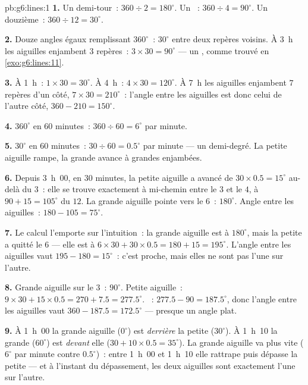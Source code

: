 \begin{solution}{pb:g6:lines:1}
\textbf{1.} Un demi-tour~: $360 \div 2 = 180^\circ$. Un ~:
$360 \div 4 = 90^\circ$. Un douzième~: $360 \div 12 = 30^\circ$.

\textbf{2.} Douze angles égaux remplissant $360^\circ$~: $30^\circ$
entre deux repères voisins. À 3~h les aiguilles enjambent $3$
repères~: $3 \times 30 = 90^\circ$ --- un , comme trouvé
en \cref{exo:g6:lines:11}.

\textbf{3.} À 1~h~: $1 \times 30 = 30^\circ$. À 4~h~:
$4 \times 30 = 120^\circ$. À 7~h les aiguilles enjambent $7$ repères
d'un côté, $7 \times 30 = 210^\circ$~: l'angle entre les aiguilles
est donc celui de l'autre côté, $360 - 210 = 150^\circ$.

\textbf{4.} $360^\circ$ en $60$ minutes~: $360 \div 60 = 6^\circ$
par minute.

\textbf{5.} $30^\circ$ en $60$ minutes~: $30 \div 60 = 0.5^\circ$
par minute --- un demi-degré. La petite aiguille rampe, la grande
avance à grandes enjambées.

\textbf{6.} Depuis 3~h~00, en $30$ minutes, la petite aiguille a
avancé de $30 \times 0.5 = 15^\circ$ au-delà du $3$~: elle se trouve
exactement à mi-chemin entre le $3$ et le $4$, à
$90 + 15 = 105^\circ$ du $12$. La grande aiguille pointe vers le
$6$~: $180^\circ$. Angle entre les aiguilles~:
$180 - 105 = 75^\circ$.

\textbf{7.} Le calcul l'emporte sur l'intuition~: la grande aiguille
est à $180^\circ$, mais la petite a quitté le $6$ --- elle est à
$6 \times 30 + 30 \times 0.5 = 180 + 15 = 195^\circ$. L'angle entre
les aiguilles vaut $195 - 180 = 15^\circ$~: c'est proche, mais elles
ne sont pas l'une sur l'autre.

\textbf{8.} Grande aiguille sur le $3$~: $90^\circ$. Petite
aiguille~: $9 \times 30 + 15 \times 0.5 = 270 + 7.5 = 277.5^\circ$.
~: $277.5 - 90 = 187.5^\circ$, donc l'angle entre les
aiguilles vaut $360 - 187.5 = 172.5^\circ$ --- presque un angle plat.

\textbf{9.} À 1~h~00 la grande aiguille ($0^\circ$) est
\emph{derrière} la petite ($30^\circ$). À 1~h~10 la grande
($60^\circ$) est \emph{devant} elle
($30 + 10 \times 0.5 = 35^\circ$). La grande aiguille va plus vite
($6^\circ$ par minute contre $0.5^\circ$)~: entre 1~h~00 et 1~h~10
elle rattrape puis dépasse la petite --- et à l'instant du
dépassement, les deux aiguilles sont exactement l'une sur l'autre.


\end{solution}
